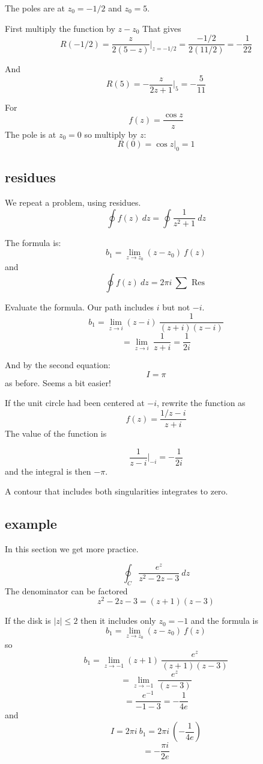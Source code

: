 \documentclass[11pt, oneside]{article}
\begin{document}
The poles are at $z_0 = -1/2$ and $z_0 = 5$.

First multiply the function by $z - z_0$  That gives
\[  R(-1/2) = \frac{z}{2 (5 - z)} \bigg |_{z = -1/2}  = \frac{-1/2}{2(11/2)} = -\frac{1}{22} \]

And
\[ R(5) = -\frac{z}{2z + 1} \bigg |_5 = - \frac{5}{11} \]

For
\[ f(z) = \frac{\cos z}{z} \]
The pole is at $z_0 = 0$ so multiply by $z$:
\[ R(0) = \cos z \bigg |_0 = 1 \]

\subsection*{residues}
We repeat a problem, using residues.  
\[ \oint f(z) \ dz = \oint \frac{1}{z^2 + 1} \ dz \]

The formula is:
\[ b_1 = \lim_{z \rightarrow z_0} (z-z_0) \ f(z)  \]
and
\[ \oint f(z) \ dz = 2 \pi i \ \sum \text{ Res } \]

Evaluate the formula.  Our path includes $i$ but not $-i$.
\[ b_1 = \lim_{z \rightarrow i} (z-i) \  \frac{1}{(z+i)(z-i)} \]
\[ = \lim_{z \rightarrow i}  \  \frac{1}{z+i} = \frac{1}{2i} \]

And by the second equation:
\[ I = \pi \]
as before.  Seems a bit easier!

If the unit circle had been centered at $-i$, rewrite the function as
\[ f(z) = \frac{1/z-i}{z+i} \]
The value of the function is

\[ \frac{1}{z-i} \bigg |_{-i} = -\frac{1}{2i} \]
and the integral is then $- \pi$.

A contour that includes both singularities integrates to zero.

\subsection*{example}
In this section we get more practice.

\[ \oint_C \frac{e^z}{z^2 - 2z - 3} \ dz \]
The denominator can be factored
\[ z^2 - 2z - 3 = (z + 1)(z - 3) \]

If the disk is $|z| \le 2$ then it includes only $z_0 = -1$ and the formula is
\[ b_1 = \lim_{z \rightarrow z_0} (z-z_0) \ f(z)  \]
so
\[ b_1 = \lim_{z \rightarrow -1} (z+1) \ \frac{e^z}{(z + 1)(z - 3)}  \]
\[ = \lim_{z \rightarrow -1} \ \frac{e^z}{(z - 3)}  \]
\[ = \frac{e^{-1}}{-1 - 3} = - \frac{1}{4 e} \]
and
\[ I = 2 \pi i \ b_1 = 2 \pi i \ (- \frac{1}{4 e}) \]
\[ = - \frac{\pi i}{2 e} \]
\end{document}
